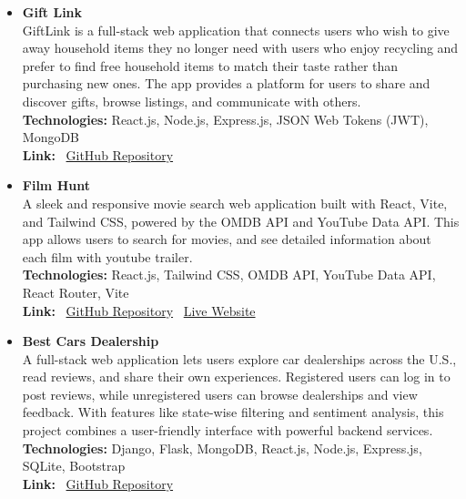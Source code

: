 
\begin{itemize}

    \item 
    {\large \textbf{Gift Link}} \\
    \small
    GiftLink is a full-stack web application that connects users who wish to give away household items they no longer need with users who enjoy recycling and prefer to find free household items to match their taste rather than purchasing new ones. The app provides a platform for users to share and discover gifts, browse listings, and communicate with others. \\
    \textbf{Technologies:} React.js, Node.js, Express.js, JSON Web Tokens (JWT), MongoDB\\
    \textbf{Link:} \faGithub~\href{https://github.com/sabitbinazad/giftLink}{GitHub Repository}

    \item 
    {\large \textbf{Film Hunt}} \\
    \small
    A sleek and responsive movie search web application built with React, Vite, and Tailwind CSS, powered by the OMDB API and YouTube Data API. This app allows users to search for movies, and see detailed information about each film with youtube trailer.\\
    \textbf{Technologies:} React.js, Tailwind CSS, OMDB API, YouTube Data API, React Router, Vite\\
    \textbf{Link:} \faGithub~\href{https://github.com/sabitbinazad/movie.git}{GitHub Repository} \quad
    \faGlobe~\href{https://sba-movie.vercel.app/}{Live Website}

    \item 
    {\large \textbf{Best Cars Dealership}} \\
    \small
    A full-stack web application lets users explore car dealerships across the U.S., read reviews, and share their own experiences. Registered users can log in to post reviews, while unregistered users can browse dealerships and view feedback. With features like state-wise filtering and sentiment analysis, this project combines a user-friendly interface with powerful backend services. \\
    \textbf{Technologies:} Django, Flask, MongoDB, React.js, Node.js, Express.js, SQLite, Bootstrap\\
    \textbf{Link:} \faGithub~\href{https://github.com/sabitbinazad/bestDeal}{GitHub Repository}

\end{itemize}

